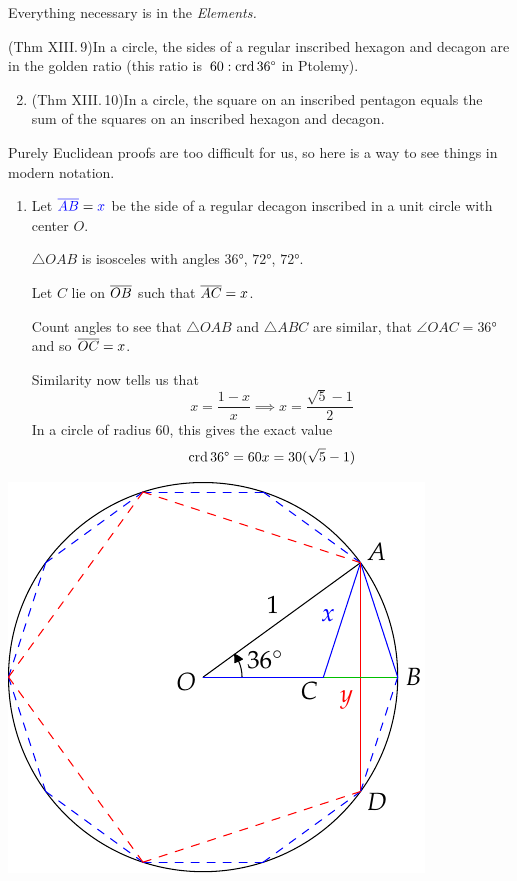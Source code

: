 
Everything necessary is in the \emph{Elements.}

\begin{thm*}{}{}
	\exstart (Thm XIII.\,9)\lstsp In a circle, the sides of a regular inscribed hexagon and decagon are in the golden ratio (this ratio is\ $60:\crd \ang{36}$ in Ptolemy).
	\begin{enumerate}\setcounter{enumi}{1}
	  \item (Thm XIII.\,10)\lstsp In a circle, the square on an inscribed pentagon equals the sum of the squares on an inscribed hexagon and decagon.
	\end{enumerate}
\end{thm*}

Purely Euclidean proofs are too difficult for us, so here is a way to see things in modern notation.

\begin{minipage}[t]{0.55\linewidth}\vspace{0pt}
	\begin{enumerate}
	  \item Let $\textcolor{blue}{\cl{AB}}=\textcolor{blue}{x}$ be the side of a regular decagon inscribed in a unit circle with center $O$.\par
	  $\triangle OAB$ is isosceles with angles $\ang{36}$, $\ang{72}$, $\ang{72}$.\par
		Let $C$ lie on $\cl{OB}$ such that $\cl{AC}=x$.\par
		Count angles to see that $\triangle OAB$ and $\triangle ABC$ are similar, that $\angle OAC=\ang{36}$ and so $\cl{OC}=x$.\par
		Similarity now tells us that
		\[
			x=\frac{1-x}x\implies x=\dfrac{\sqrt 5-1}2
		\]
		In a circle of radius 60, this gives the exact value
	  \[
	  	\crd \ang{36}=60x=30(\sqrt 5-1)
	  \]
	  \end{enumerate}
\end{minipage}
\hfill
\begin{minipage}[t]{0.44\linewidth}\vspace{0pt}
	\flushright\includegraphics[scale=0.95]{pentagon}
\end{minipage}

